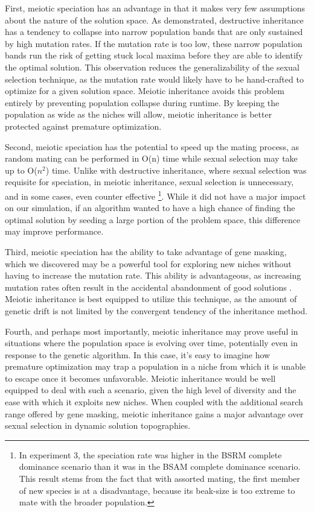 \documentclass{article}
\begin{document}
First, meiotic speciation has an advantage in that it makes very few assumptions about the nature of the solution space. As demonstrated, destructive inheritance has a tendency to collapse into narrow population bands that are only sustained by high mutation rates. If the mutation rate is too low, these narrow population bands run the risk of getting stuck local maxima before they are able to identify the optimal solution. This observation reduces the generalizability of the sexual selection technique, as the mutation rate would likely have to be hand-crafted to optimize for a given solution space. Meiotic inheritance avoids this problem entirely by preventing population collapse during runtime. By keeping the population as wide as the niches will allow, meiotic inheritance is better protected against premature optimization.

Second, meiotic speciation has the potential to speed up the mating process, as random mating can be performed in O(n) time while sexual selection may take up to O($n^2$) time. Unlike with destructive inheritance, where sexual selection was requisite for speciation, in meiotic inheritance, sexual selection is unnecessary, and in some cases, even counter effective \footnote{In experiment 3, the speciation rate was higher in the BSRM complete dominance scenario than it was in the BSAM complete dominance scenario. This result stems from the fact that with assorted mating, the first member of new species is at a disadvantage, because its beak-size is too extreme to mate with the broader population.}. While it did not have a major impact on our simulation, if an algorithm wanted to have a high chance of finding the optimal solution by seeding a large portion of the problem space, this difference may improve performance. 

Third, meiotic speciation has the ability to take advantage of gene masking, which we discovered may be a powerful tool for exploring new niches without having to increase the mutation rate. This ability is advantageous, as increasing mutation rates often result in the accidental abandonment of good solutions \cite{TAGGING}. Meiotic inheritance is best equipped to utilize this technique, as the amount of genetic drift is not limited by the convergent tendency of the inheritance method.

Fourth, and perhaps most importantly, meiotic inheritance may prove useful in situations where the population space is evolving over time, potentially even in response to the genetic algorithm. In this case, it's easy to imagine how premature optimization may trap a population in a niche from which it is unable to escape once it becomes unfavorable. Meiotic inheritance would be well equipped to deal with such a scenario, given the high level of diversity and the ease with which it exploits new niches. When coupled with the additional search range offered by gene masking, meiotic inheritance gains a major advantage over sexual selection in dynamic solution topographies. 
\end{document}
